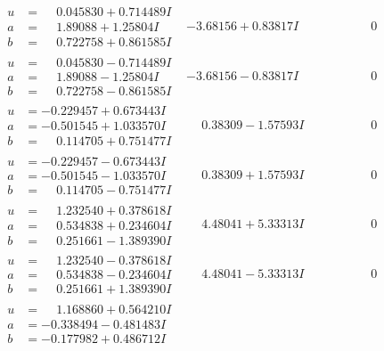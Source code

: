 \documentclass[1p]{elsarticle_modified}
\theoremstyle{definition}
\begin{document}
$$\begin{array}{c|c|c}
\begin{aligned}
u &= \phantom{-}0.045830 + 0.714489 I \\
a &= \phantom{-}1.89088 + 1.25804 I \\
b &= \phantom{-}0.722758 + 0.861585 I\end{aligned}
 & -3.68156 + 0.83817 I & \phantom{-0.000000 } 0 \\ \hline\begin{aligned}
u &= \phantom{-}0.045830 - 0.714489 I \\
a &= \phantom{-}1.89088 - 1.25804 I \\
b &= \phantom{-}0.722758 - 0.861585 I\end{aligned}
 & -3.68156 - 0.83817 I & \phantom{-0.000000 } 0 \\ \hline\begin{aligned}
u &= -0.229457 + 0.673443 I \\
a &= -0.501545 + 1.033570 I \\
b &= \phantom{-}0.114705 + 0.751477 I\end{aligned}
 & \phantom{-}0.38309 - 1.57593 I & \phantom{-0.000000 } 0 \\ \hline\begin{aligned}
u &= -0.229457 - 0.673443 I \\
a &= -0.501545 - 1.033570 I \\
b &= \phantom{-}0.114705 - 0.751477 I\end{aligned}
 & \phantom{-}0.38309 + 1.57593 I & \phantom{-0.000000 } 0 \\ \hline\begin{aligned}
u &= \phantom{-}1.232540 + 0.378618 I \\
a &= \phantom{-}0.534838 + 0.234604 I \\
b &= \phantom{-}0.251661 - 1.389390 I\end{aligned}
 & \phantom{-}4.48041 + 5.33313 I & \phantom{-0.000000 } 0 \\ \hline\begin{aligned}
u &= \phantom{-}1.232540 - 0.378618 I \\
a &= \phantom{-}0.534838 - 0.234604 I \\
b &= \phantom{-}0.251661 + 1.389390 I\end{aligned}
 & \phantom{-}4.48041 - 5.33313 I & \phantom{-0.000000 } 0 \\ \hline\begin{aligned}
u &= \phantom{-}1.168860 + 0.564210 I \\
a &= -0.338494 - 0.481483 I \\
b &= -0.177982 + 0.486712 I\end{aligned}

\end{array}$$
\end{document}
